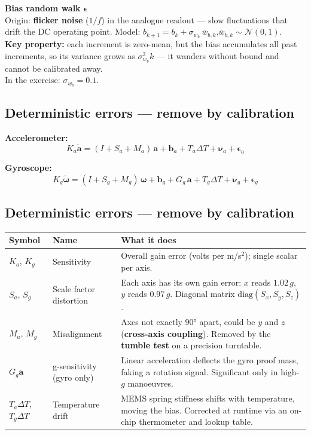 \documentclass[12pt, a4paper]{article}
\begin{document}
\begin{defbox}
  \textbf{Bias random walk} $\boldsymbol{\epsilon}$\\
  Origin: \textbf{flicker noise} ($1/f$) in the analogue readout --- slow fluctuations that drift the DC operating point.
  Model: $b_{k+1} = b_k + \sigma_{w_b}\,\bar{w}_{b,k}$,\quad $\bar{w}_{b,k} \sim \mathcal{N}(0,1)$.\\[4pt]
  \textbf{Key property:} each increment is zero-mean, but the bias accumulates all past increments, so its variance grows as $\sigma_{w_b}^2 k$ --- it wanders without bound and cannot be calibrated away.\\[4pt]
  In the exercise: $\sigma_{w_b} = 0.1$.
\end{defbox}
\subsection*{Deterministic errors --- remove by calibration}

\textbf{Accelerometer:}
\[
  K_a\tilde{\mathbf{a}}
    = (I + S_a + M_a)\,\mathbf{a}
      + \mathbf{b}_a
      + T_a\Delta T
      + \boldsymbol{\nu}_a
      + \boldsymbol{\epsilon}_a
\]

\textbf{Gyroscope:}
\[
  K_g\tilde{\boldsymbol{\omega}}
    = (I + S_g + M_g)\,\boldsymbol{\omega}
      + \mathbf{b}_g
      + G_g\,\mathbf{a}
      + T_g\Delta T
      + \boldsymbol{\nu}_g
      + \boldsymbol{\epsilon}_g
\]
\subsection*{Deterministic errors --- remove by calibration}
\begin{center}
\renewcommand{\arraystretch}{1.4}
\begin{tabular}{p{2.2cm} p{2.8cm} p{8.2cm}}
  \toprule
  \textbf{Symbol} & \textbf{Name} & \textbf{What it does} \\
  \midrule
  $K_a$, $K_g$
    & Sensitivity
    & Overall gain error (volts per m/s$^2$); single scalar per axis. \\
  $S_a$, $S_g$
    & Scale factor distortion
    & Each axis has its own gain error: $x$ reads $1.02\,g$, $y$ reads
      $0.97\,g$.
      Diagonal matrix $\mathrm{diag}(S_x, S_y, S_z)$. \\
  $M_a$, $M_g$
    & Misalignment
    & Axes not exactly $90°$ apart, could be $y$ and $z$ (\textbf{cross-axis coupling}).
      Removed by the \textbf{tumble test} on a precision turntable. \\
  $G_g\mathbf{a}$
    & g-sensitivity (gyro only)
    & Linear acceleration deflects the gyro proof mass, faking a
      rotation signal.
      Significant only in high-$g$ manoeuvres. \\
  $T_a\Delta T$, $T_g\Delta T$
    & Temperature drift
    & MEMS spring stiffness shifts with temperature, moving the bias.
      Corrected at runtime via an on-chip thermometer and lookup table. \\
  \bottomrule
\end{tabular}
\end{center}
\end{document}

